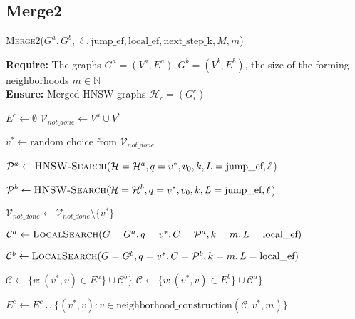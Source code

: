 \documentclass{article}
\begin{document}
\subsection{Merge2}





\begin{algorithm}
\caption{\textsc{Merge2}($G^a, G^b, \ell, \text{jump\_ef}, \text{local\_ef}, \text{next\_step\_k}, M, m$)}\label{alg:merge2}
\textbf{Require:} The graphs $G^a=(V^a,E^a), G^b=(V^b,E^b)$, the size of the forming neighborhoods $m \in \mathbb{N} $ \\
\textbf{Ensure:}  Merged HNSW graphs $\mathcal{H}_c = (G^c_i)$ 
\begin{algorithmic}[1]

\State $E^c \gets \emptyset$
\State $\mathcal{V}_{not\_done} \gets V^a \cup V^b$

    \State $v^* \gets \text{random choice from } \mathcal{V}_{not\_done}$

    \State $\mathcal{P}^a  \gets \textsc{HNSW-Search}(\mathcal{H}=\mathcal{H}^a, q=v^*, v_0, k, L=\text{jump\_ef}, \ell $)

    \State $\mathcal{P}^b \gets \textsc{HNSW-Search}(\mathcal{H}=\mathcal{H}^b, q=v^*, v_0, k, L=\text{jump\_ef}, \ell $)
    
    
        \State $\mathcal{V}_{not\_done} \gets \mathcal{V}_{not\_done} \setminus \{v^*\}$
        

        \State $ \mathcal{C}^a  \gets \textsc{LocalSearch}(G=G^a, q=v^*, C=\mathcal{P}^a  , k=m, L=\text{local\_ef})$
        
        \State $\mathcal{C}^b \gets \textsc{LocalSearch}(G=G^b, q=v^*, C=\mathcal{P}^b , k=m, L=\text{local\_ef})$
        
            \State $\mathcal{C}\gets  \{v : (v^*, v) \in E^a \} \cup  \mathcal{C}^b\}$
        \Else
            \State $\mathcal{C} \gets  \{v : (v^*, v) \in E^b \} \cup  \mathcal{C}^a\}$
        \EndIf
        

        \State $E^c \gets E^c \cup \{ (v^*, v) : v \in \text{neighborhood\_construction}(\mathcal{C}, v^*, m) \}$
        

\end{algorithmic}
\end{algorithm}
\end{document}
